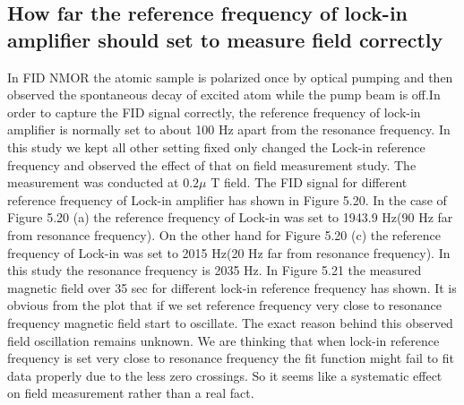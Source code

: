    \subsection{How far the reference frequency of lock-in amplifier should set to measure field correctly}
  
  In FID NMOR the atomic sample is polarized once by optical pumping and then observed the spontaneous decay of excited atom while the pump beam is off.In order to capture the FID signal correctly, the reference frequency of lock-in amplifier is normally set to about 100 Hz apart from the resonance frequency. In this study we kept all other setting fixed only changed the Lock-in reference frequency and observed the effect of that on field measurement study. The measurement was conducted at $0.2\mu$ T field. The FID signal for different reference frequency of Lock-in amplifier has shown in Figure 5.20. In the case of Figure 5.20 (a) the reference frequency of Lock-in was set to 1943.9 Hz(90 Hz far from resonance frequency). On the other hand for Figure 5.20 (c) the reference frequency of Lock-in was set to 2015 Hz(20 Hz far from resonance frequency). In this study the resonance frequency is 2035 Hz. In Figure 5.21 the measured magnetic field over 35 sec for different lock-in reference frequency has shown. It is obvious from the plot that if we set reference frequency very close to resonance frequency magnetic field start to oscillate. The exact reason behind this observed field oscillation remains unknown. We are thinking that when lock-in reference frequency is set very close to resonance frequency the fit function might fail to fit data properly due to the less zero crossings. So it seems like a systematic effect on field measurement rather than a real fact.

